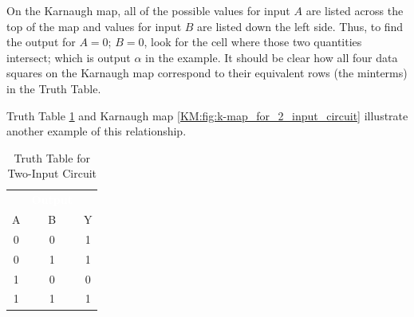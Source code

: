 On the Karnaugh map, all of the possible values for input $ A $ are listed across the top of the map and values for input $ B $ are listed down the left side. Thus, to find the output for $ A=0 $; $ B=0 $, look for the cell where those two quantities intersect; which is output $ \alpha $ in the example. It should be clear how all four data squares on the Karnaugh map correspond to their equivalent rows (the minterms) in the Truth Table. 

Truth Table \ref{KM:tab:truth_table_for_2-input_circuit} and Karnaugh map \ref{KM:fig:k-map_for_2_input_circuit} illustrate another example of this relationship.

\begin{table}[H]
  \sffamily
  \newcommand{\head}[1]{\textcolor{white}{\textbf{#1}}}    
  \begin{center}
    \begin{tabular}{ccc} 
      \rowcolor{black!75}
      \multicolumn{2}{c}{\head{Inputs}} & \head{Output} \\
      A & B & Y \\
      \hline
      0 & 0 & 1 \\
      0 & 1 & 1 \\
      1 & 0 & 0 \\
      1 & 1 & 1 
    \end{tabular}
  \end{center}
  \caption{Truth Table for Two-Input Circuit}
  \label{KM:tab:truth_table_for_2-input_circuit}
\end{table}

